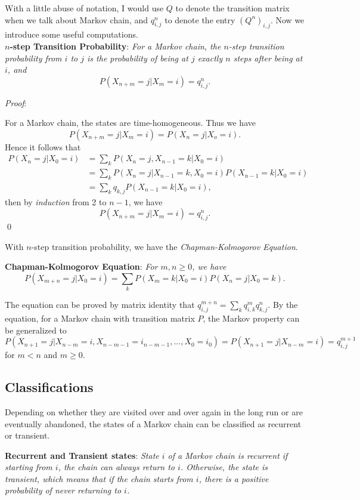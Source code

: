 \documentclass{progartcn}
\begin{document}
		With a little abuse of notation, I would use $Q$ to denote the transition matrix when we talk about Markov chain, and $q^n_{i,j}$ to denote the entry $(Q^n)_{i,j}$. Now we introduce some useful computations.\\

		\textbf{$n$-step Transition Probability}: \textit{For a Markov chain, the $n$-step transition probability from $i$ to $j$ is the probability of being at $j$ exactly $n$ steps after being at $i$, and}
		\[P(X_{n+m}=j|X_m=i)=q^n_{i,j}.\]

		\textit{Proof}:

		For a Markov chain, the states are time-homogeneous. Thus we have 
		\[P(X_{n+m}=j|X_m=i)=P(X_n=j|X_o=i).\]
		Hence it follows that
		\begin{align*}
		P(X_n=j|X_0=i)&=\sum_k P(X_n=j, X_{n-1}=k | X_0=i )\tag{by LOTP}\\
		&=\sum_k P(X_n=j|X_{n-1}=k, X_0=i)P(X_{n-1}=k|X_0=i)\\
		&=\sum_k q_{k,j}P(X_{n-1}=k|X_0=i),\tag{by Markov Property}
		\end{align*}
		then by \textit{induction} from 2 to $n-1$, we have
		\[P(X_{n+m}=j|X_m=i)=q^n_{i,j}.\]
		\qed

		With $n$-step transition probability, we have the \textit{Chapman-Kolmogorov Equation}.

		\textbf{Chapman-Kolmogorov Equation}: \textit{For $m,n\ge 0$, we have}
		\[P(X_{m+n}=j|X_0=i)=\sum_k P(X_m=k|X_0=i)P(X_n=j|X_0=k).\]

		The equation can be proved by matrix identity that $q^{m+n}_{i,j}=\sum_{k}q^m_{i,k}q^n_{k,j}$. By the equation, for a Markov chain with transition matrix $P$, the Markov property can be generalized to
		\[P(X_{n+1}=j|X_{n-m}=i, X_{n-m-1}=i_{n-m-1}, ..., X_0=i_0)=P(X_{n+1}=j|X_{n-m}=i)=q^{m+1}_{i,j}\]
		for $m<n$ and $m\ge0$.\\

	\subsection{Classifications}

		Depending on whether they are visited over and over again in the long run or are eventually abandoned, the states of a Markov chain can be classified as recurrent or transient.

		\textbf{Recurrent and Transient states}: \textit{State $i$ of a Markov chain is recurrent if starting from $i$, the chain can always return to $i$. Otherwise, the state is transient, which means that if the chain starts from $i$, there is a positive probability of never returning to $i$.}\\
\end{document}
